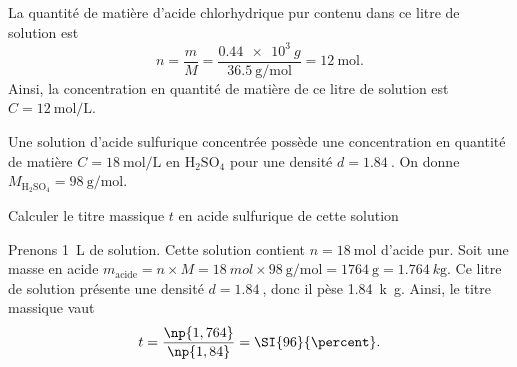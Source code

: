 
\begin{corrige}
La quantité de matière d'acide chlorhydrique pur contenu dans ce litre de solution est 
\[
n=\frac{m}{M}=\frac{\SI{0,44e3}{g}}{\SI{36,5}{\gram\per\mole}}=\SI{12}{\mole}.
\] 
Ainsi, la concentration en quantité de matière de ce litre de solution est $C=\SI{12}{\mole\per\liter}$.
\end{corrige}


\finEntrainement




\hauteurLargeurCadreReponse		{7mm}{5cm}
\typeEntrainement				{} %
\initialisationEntrainement

\debutEntrainement

Une solution d'acide sulfurique concentrée possède une concentration en quantité de matière $C=\SI{18}{\mol\per\liter}$ en $\textrm{H}_2\textrm{S}\textrm{O}_4$ pour une densité $d=\SI{1,84}{}$. On donne $M_{\textrm{H}_2\textrm{S}\textrm{O}_4}=\SI{98}{\gram\per\mole}$.

\begin{enonce}
Calculer le titre massique $t$ en acide sulfurique de cette solution
\end{enonce}


\begin{corrige}
Prenons \SI{1}{\liter} de solution. Cette solution contient $n=\SI{18}{\mole}$ d'acide pur. Soit une masse en acide $m_\text{acide}=n\times M=\SI{18}{mol}\times\SI{98}{\gram\per\mole}=\SI{1764}{\gram}=\SI{1,764}{k\gram}$. Ce litre de solution présente une densité $d=\SI{1,84}{}$, donc il pèse \SI{1,84}{k\gram}. Ainsi, le titre massique vaut 
\[
t=\frac{\np{1,764}}{\np{1,84}}=\SI{96}{\percent}.
\]
\end{corrige}

